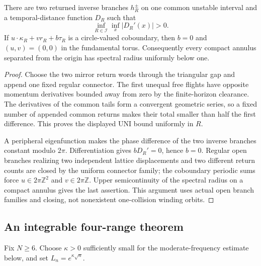 \begin{theorem}
\label{thm:r13-a2-arithmetic}
There are two returned inverse branches $h_R^\pm$ on one common unstable
interval and a temporal-distance function $D_R$ such that
\[
 \inf_{R\in\mathcal I}\inf_x|D_R'(x)|>0.
\]
If $u\cdot\kappa_R+vr_R+b\tau_R$ is a circle-valued coboundary, then
$b=0$ and $(u,v)=(0,0)$ in the fundamental torus.  Consequently every compact
annulus separated from the origin has spectral radius uniformly below one.
\end{theorem}

\begin{proof}
Choose the two mirror return words through the triangular gap and append one
fixed regular connector.  The first unequal free flights have opposite
momentum derivatives bounded away from zero by the finite-horizon clearance.
The derivatives of the common tails form a convergent geometric series, so a
fixed number of appended common returns makes their total smaller than half
the first difference.  This proves the displayed UNI bound uniformly in $R$.

A peripheral eigenfunction makes the phase difference of the two inverse
branches constant modulo $2\pi$.  Differentiation gives $bD_R'=0$, hence
$b=0$.  Regular open branches realizing two independent lattice displacements
and two different return counts are closed by the uniform connector family;
the coboundary periodic sums force $u\in2\pi\mathbb Z^2$ and
$v\in2\pi\mathbb Z$.  Upper semicontinuity of the spectral radius on a compact
annulus gives the last assertion.  This argument uses actual open branch
families and closing, not nonexistent one-collision winding orbits.
\end{proof}

\subsection{An integrable four-range theorem}

Fix $N\ge6$.  Choose $\kappa>0$ sufficiently small for the moderate-frequency
estimate below, and set $L_n=e^{\kappa\sqrt n}$.


